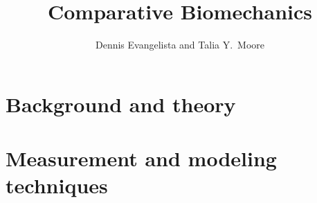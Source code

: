 \documentclass{tufte-book}
\title{Comparative Biomechanics}
\author{Dennis Evangelista and Talia Y.\ Moore}
\theoremstyle{plain}
\theoremstyle{defninition}
\theoremstyle{remark}
\begin{document}
\frontmatter
\maketitle




\tableofcontents
\listoffigures
\listoftables





\mainmatter

\part{Background and theory}


\part{Measurement and modeling techniques}


\appendix


\setcounter{secnumdepth}{-1} %


\pagestyle{plain}
\printindex
\end{document}
